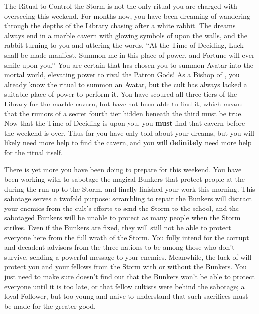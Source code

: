 \documentclass[char]{GL2020}
\begin{document}
The Ritual to Control the Storm is not the only ritual you are charged with overseeing this weekend. For months now, you have been dreaming of wandering through the depths of the Library chasing after a white rabbit. The dreams always end in a marble cavern with glowing symbols of \cGenesis{} upon the walls, and the rabbit turning to you and uttering the words, ``At the Time of Deciding, Luck shall be made manifest. Summon me in this place of power, and Fortune will ever smile upon you.’’ You are certain that \cGenesis{} has chosen you to summon \cGenesis{\their} Avatar into the mortal world, elevating \cGenesis{\their} power to rival the Patron Gods! As a Bishop of \cGenesis{}, you already know the ritual to summon an Avatar, but the cult has always lacked a suitable place of power to perform it. You have scoured all three tiers of the Library for the marble cavern, but have not been able to find it, which means that the rumors of a secret fourth tier hidden beneath the third must be true. Now that the Time of Deciding is upon you, you \textbf{must} find that cavern before the weekend is over. Thus far you have only told \cChupLeader{} about your dreams, but you will likely need more help to find the cavern, and you will \textbf{definitely} need more help for the ritual itself. 

There is yet more you have been doing to prepare for this weekend. You have been working with \cChupInventor{} to sabotage the magical Bunkers that protect people at the \pSchool{} during the run up to the Storm, and finally finished your work this morning. This sabotage serves a twofold purpose: scrambling to repair the Bunkers will distract your enemies from the cult’s efforts to send the Storm to the school, and the sabotaged Bunkers will be unable to protect as many people when the Storm strikes. Even if the Bunkers are fixed, they will still not be able to protect everyone here from the full wrath of the Storm. You fully intend for the corrupt and decadent advisors from the three nations to be among those who don't survive, sending a powerful message to your enemies. Meanwhile, the luck of \cGenesis{} will protect you and your fellows from the Storm with or without the Bunkers. You just need to make sure \cChupStudent{} doesn't find out that the Bunkers won't be able to protect everyone until it is too late, or that \cChupStudent{\their} fellow cultists were behind the sabotage; \cChupStudent{\theyare} a loyal Follower, but too young and naive to understand that such sacrifices must be made for the greater good. 
\end{document}
